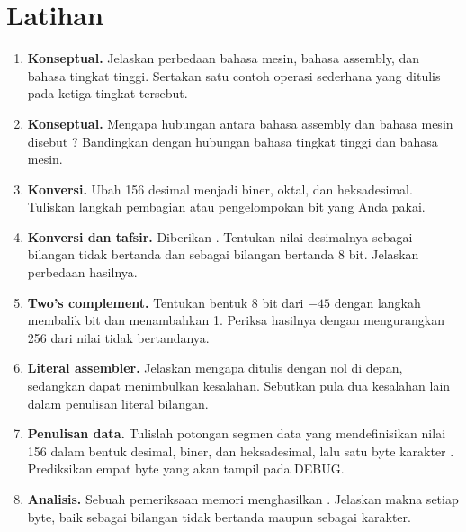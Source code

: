 \section{Latihan}
\label{sec:latihan-bab3}

\begin{enumerate}
    \item \textbf{Konseptual.} Jelaskan perbedaan bahasa mesin, bahasa
          assembly, dan bahasa tingkat tinggi. Sertakan satu contoh
          operasi sederhana yang ditulis pada ketiga tingkat tersebut.

    \item \textbf{Konseptual.} Mengapa hubungan antara bahasa assembly
          dan bahasa mesin disebut ? Bandingkan dengan
          hubungan bahasa tingkat tinggi dan bahasa mesin.

    \item \textbf{Konversi.} Ubah 156 desimal menjadi biner, oktal,
          dan heksadesimal. Tuliskan langkah pembagian atau
          pengelompokan bit yang Anda pakai.

    \item \textbf{Konversi dan tafsir.} Diberikan .
          Tentukan nilai desimalnya sebagai bilangan tidak bertanda
          dan sebagai bilangan bertanda 8 bit. Jelaskan perbedaan
          hasilnya.

    \item \textbf{Two's complement.} Tentukan bentuk 8 bit dari $-45$
          dengan langkah membalik bit dan menambahkan 1. Periksa
          hasilnya dengan mengurangkan 256 dari nilai tidak
          bertandanya.

    \item \textbf{Literal assembler.} Jelaskan mengapa 
          ditulis dengan nol di depan, sedangkan  dapat
          menimbulkan kesalahan. Sebutkan pula dua kesalahan lain
          dalam penulisan literal bilangan.

    \item \textbf{Penulisan data.} Tulislah potongan segmen data yang
          mendefinisikan nilai 156 dalam bentuk desimal, biner, dan
          heksadesimal, lalu satu byte karakter .
          Prediksikan empat byte yang akan tampil pada DEBUG.

    \item \textbf{Analisis.} Sebuah pemeriksaan memori menghasilkan
          . Jelaskan makna setiap byte, baik sebagai
          bilangan tidak bertanda maupun sebagai karakter.
\end{enumerate}

